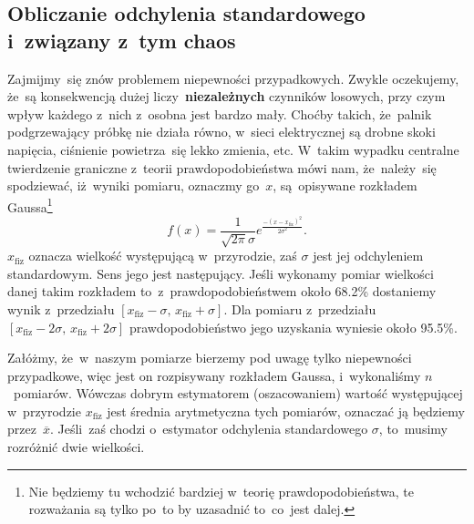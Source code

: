 \documentclass[a4paper,11pt]{article}
\newcommand{\tb}{\textbf}
\begin{document}
\subsection{Obliczanie odchylenia standardowego i~związany z~tym
  chaos}
\label{sec:obliczanie}

Zajmijmy~się znów problemem niepewności przypadkowych. Zwykle
oczekujemy, że~są konsekwencją dużej liczy~\tb{niezależnych} czynników
losowych, przy czym wpływ każdego z~nich z~osobna jest bardzo mały.
Choćby takich, że~palnik podgrzewający próbkę nie działa równo,
w~sieci elektrycznej są drobne skoki napięcia, ciśnienie powietrza~się
lekko zmienia, etc. W~takim wypadku centralne twierdzenie graniczne
z~teorii prawdopodobieństwa mówi nam, że~należy~się spodziewać,
iż~wyniki pomiaru, oznaczmy go~$x$, są~opisywane rozkładem
Gaussa\footnote{Nie będziemy tu wchodzić bardziej w~teorię
  prawdopodobieństwa, te rozważania są tylko po~to by uzasadnić
  to~co~jest dalej.}
\begin{equation}
  \label{eq:4}
  f( x ) = \frac{ 1 }{ \sqrt{ 2 \pi } \sigma }
  e^{ \frac{ -( x - x_{ \mathrm{fiz} } )^{ 2 } }{ 2 \sigma^{ 2 } } }.
\end{equation}
$x_{ \textrm{fiz} }$ oznacza wielkość występującą w~przyrodzie, zaś
$\sigma$ jest jej odchyleniem standardowym. Sens jego jest
następujący. Jeśli wykonamy pomiar wielkości danej takim rozkładem
to~z~prawdopodobieństwem około 68.2\% dostaniemy wynik z~przedziału
$[ x_{ \textrm{fiz} } - \sigma,\, x_{ \textrm{fiz} } + \sigma ]$. Dla
pomiaru z~przedziału
$[ x_{ \textrm{fiz} } - 2\sigma,\, x_{ \textrm{fiz} } + 2\sigma ]$
prawdopodobieństwo jego uzyskania wyniesie około 95.5\%.

Załóżmy, że~w~naszym pomiarze bierzemy pod uwagę tylko niepewności
przypadkowe, więc jest on rozpisywany rozkładem Gaussa, i~wykonaliśmy
$n$~pomiarów. Wówczas dobrym estymatorem (oszacowaniem) wartość
występującej w~przyrodzie $x_{ \textrm{fiz} }$ jest średnia
arytmetyczna tych pomiarów, oznaczać ją będziemy przez~$\overline{x}$.
Jeśli~zaś chodzi o~estymator odchylenia standardowego $\sigma$,
to~musimy rozróżnić dwie wielkości.
\end{document}
